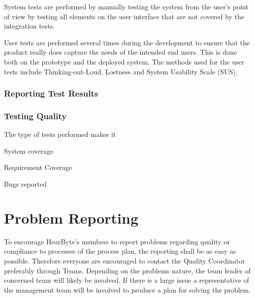 \documentclass{article}
\begin{document}
	System tests are performed by manually testing the system from the user's point of view by testing all elements on the user interface that are not covered by the integration tests. 
	
	User tests are performed several times during the development to ensure that the product really does capture the needs of the intended end users. This is done both on the prototype and the deployed system. The methods used for the user tests include Thinking-out-Loud, Lostness and System Usability Scale (SUS).
	
	\subsubsection{Reporting Test Results}
	
	
	\subsubsection{Testing Quality}
	The type of tests performed makes it 
	
	System coverage
	
	Requirement Coverage
	
	Bugs reported
	
	

	\clearpage
	\section{Problem Reporting}
	To encourage HearByte's members to report problems regarding quality or compliance to processes of the process plan, the reporting shall be as easy as possible. Therefore everyone are encouraged to contact the Quality Coordinator preferably through Teams. Depending on the problems nature, the team leader of concerned team will likely be involved. If there is a large issue a representative of the management team will be involved to produce a plan for solving the problem.
	
	
\end{document}
